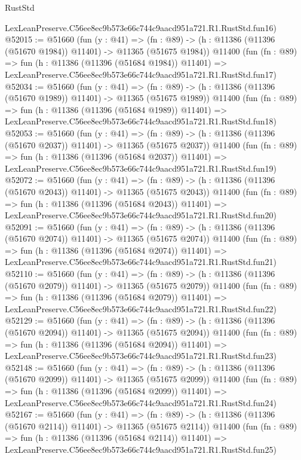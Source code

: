 \begin{lexlean}{RustStd}
\begin{coremodule}
    LexLeanPreserve.C56ee8ec9b573e66c744c9aacd951a721.R1.RustStd.fun16)
@52015 := @51660
    (fun (y : @41) =>
    (fn : @89) -> (h : @11386 (@11396 (@51670 @1984)) @11401) -> @11365 (@51675 @1984))
    @11400
    (fun (fn : @89) =>
    fun (h : @11386 (@11396 (@51684 @1984)) @11401) =>
    LexLeanPreserve.C56ee8ec9b573e66c744c9aacd951a721.R1.RustStd.fun17)
@52034 := @51660
    (fun (y : @41) =>
    (fn : @89) -> (h : @11386 (@11396 (@51670 @1989)) @11401) -> @11365 (@51675 @1989))
    @11400
    (fun (fn : @89) =>
    fun (h : @11386 (@11396 (@51684 @1989)) @11401) =>
    LexLeanPreserve.C56ee8ec9b573e66c744c9aacd951a721.R1.RustStd.fun18)
@52053 := @51660
    (fun (y : @41) =>
    (fn : @89) -> (h : @11386 (@11396 (@51670 @2037)) @11401) -> @11365 (@51675 @2037))
    @11400
    (fun (fn : @89) =>
    fun (h : @11386 (@11396 (@51684 @2037)) @11401) =>
    LexLeanPreserve.C56ee8ec9b573e66c744c9aacd951a721.R1.RustStd.fun19)
@52072 := @51660
    (fun (y : @41) =>
    (fn : @89) -> (h : @11386 (@11396 (@51670 @2043)) @11401) -> @11365 (@51675 @2043))
    @11400
    (fun (fn : @89) =>
    fun (h : @11386 (@11396 (@51684 @2043)) @11401) =>
    LexLeanPreserve.C56ee8ec9b573e66c744c9aacd951a721.R1.RustStd.fun20)
@52091 := @51660
    (fun (y : @41) =>
    (fn : @89) -> (h : @11386 (@11396 (@51670 @2074)) @11401) -> @11365 (@51675 @2074))
    @11400
    (fun (fn : @89) =>
    fun (h : @11386 (@11396 (@51684 @2074)) @11401) =>
    LexLeanPreserve.C56ee8ec9b573e66c744c9aacd951a721.R1.RustStd.fun21)
@52110 := @51660
    (fun (y : @41) =>
    (fn : @89) -> (h : @11386 (@11396 (@51670 @2079)) @11401) -> @11365 (@51675 @2079))
    @11400
    (fun (fn : @89) =>
    fun (h : @11386 (@11396 (@51684 @2079)) @11401) =>
    LexLeanPreserve.C56ee8ec9b573e66c744c9aacd951a721.R1.RustStd.fun22)
@52129 := @51660
    (fun (y : @41) =>
    (fn : @89) -> (h : @11386 (@11396 (@51670 @2094)) @11401) -> @11365 (@51675 @2094))
    @11400
    (fun (fn : @89) =>
    fun (h : @11386 (@11396 (@51684 @2094)) @11401) =>
    LexLeanPreserve.C56ee8ec9b573e66c744c9aacd951a721.R1.RustStd.fun23)
@52148 := @51660
    (fun (y : @41) =>
    (fn : @89) -> (h : @11386 (@11396 (@51670 @2099)) @11401) -> @11365 (@51675 @2099))
    @11400
    (fun (fn : @89) =>
    fun (h : @11386 (@11396 (@51684 @2099)) @11401) =>
    LexLeanPreserve.C56ee8ec9b573e66c744c9aacd951a721.R1.RustStd.fun24)
@52167 := @51660
    (fun (y : @41) =>
    (fn : @89) -> (h : @11386 (@11396 (@51670 @2114)) @11401) -> @11365 (@51675 @2114))
    @11400
    (fun (fn : @89) =>
    fun (h : @11386 (@11396 (@51684 @2114)) @11401) =>
    LexLeanPreserve.C56ee8ec9b573e66c744c9aacd951a721.R1.RustStd.fun25)

\end{coremodule}
\end{lexlean}
